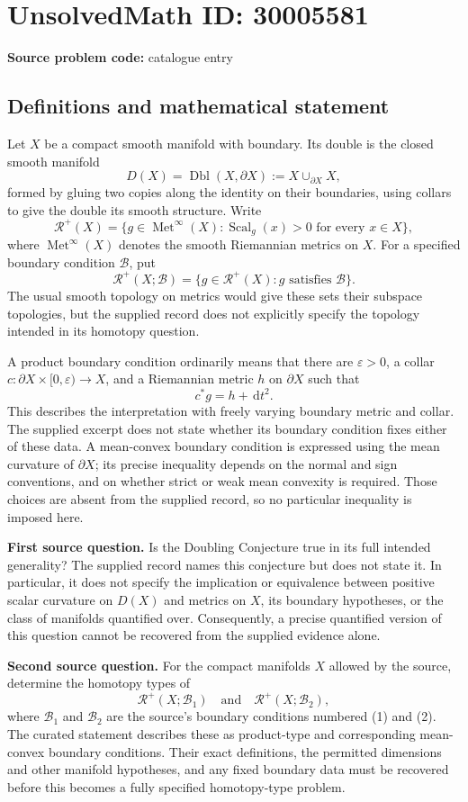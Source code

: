 \documentclass[11pt]{article}
\newcommand{\dd}{\,\mathrm{d}}
\begin{document}
\section*{UnsolvedMath ID: 30005581}
\textbf{Source problem code:} catalogue entry
\subsection{Definitions and mathematical statement}
Let \(X\) be a compact smooth manifold with boundary. Its double is the closed smooth manifold
\[
D(X)=\operatorname{Dbl}(X,\partial X):=X\cup_{\partial X}X,
\]
formed by gluing two copies along the identity on their boundaries, using collars to give the double its smooth structure. Write
\[
\mathcal R^+(X)=\{g\in\operatorname{Met}^{\infty}(X):\operatorname{Scal}_g(x)>0\text{ for every }x\in X\},
\]
where \(\operatorname{Met}^{\infty}(X)\) denotes the smooth Riemannian metrics on \(X\). For a specified boundary condition \(\mathcal B\), put
\[
\mathcal R^+(X;\mathcal B)=\{g\in\mathcal R^+(X):g\text{ satisfies }\mathcal B\}.
\]
The usual smooth topology on metrics would give these sets their subspace topologies, but the supplied record does not explicitly specify the topology intended in its homotopy question.

A product boundary condition ordinarily means that there are \(\varepsilon>0\), a collar \(c:\partial X\times[0,\varepsilon)\longrightarrow X\), and a Riemannian metric \(h\) on \(\partial X\) such that
\[
c^*g=h+\dd t^2.
\]
This describes the interpretation with freely varying boundary metric and collar. The supplied excerpt does not state whether its boundary condition fixes either of these data. A mean-convex boundary condition is expressed using the mean curvature of \(\partial X\); its precise inequality depends on the normal and sign conventions, and on whether strict or weak mean convexity is required. Those choices are absent from the supplied record, so no particular inequality is imposed here.

\textbf{First source question.} Is the Doubling Conjecture true in its full intended generality? The supplied record names this conjecture but does not state it. In particular, it does not specify the implication or equivalence between positive scalar curvature on \(D(X)\) and metrics on \(X\), its boundary hypotheses, or the class of manifolds quantified over. Consequently, a precise quantified version of this question cannot be recovered from the supplied evidence alone.

\textbf{Second source question.} For the compact manifolds \(X\) allowed by the source, determine the homotopy types of
\[
\mathcal R^+(X;\mathcal B_1)
\quad\text{and}\quad
\mathcal R^+(X;\mathcal B_2),
\]
where \(\mathcal B_1\) and \(\mathcal B_2\) are the source's boundary conditions numbered (1) and (2). The curated statement describes these as product-type and corresponding mean-convex boundary conditions. Their exact definitions, the permitted dimensions and other manifold hypotheses, and any fixed boundary data must be recovered before this becomes a fully specified homotopy-type problem.
\end{document}
